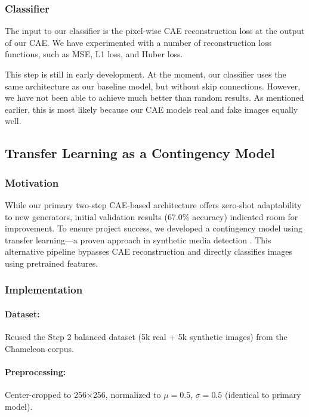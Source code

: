 \documentclass{article} %
\begin{document}
\subsubsection{Classifier}

The input to our classifier is the pixel-wise CAE reconstruction loss at the output of our CAE. We have experimented with a number of reconstruction loss functions, such as MSE, L1 loss, and Huber loss.

This step is still in early development. At the moment, our classifier uses the same architecture as our baseline model, but without skip connections. However, we have not been able to achieve much better than random results. As mentioned earlier, this is most likely because our CAE models real and fake images equally well.
\subsection{Transfer Learning as a Contingency Model}

\subsubsection{Motivation}
While our primary two-step CAE-based architecture offers zero-shot adaptability to new generators, initial validation results (67.0\% accuracy) indicated room for improvement. To ensure project success, we developed a contingency model using transfer learning—a proven approach in synthetic media detection \citep{cozzolino2024raisingbaraigeneratedimage}. This alternative pipeline bypasses CAE reconstruction and directly classifies images using pretrained features.

\subsubsection{Implementation}

\paragraph{Dataset:}
Reused the Step 2 balanced dataset (5k real + 5k synthetic images) from the Chameleon corpus.

\paragraph{Preprocessing:} Center-cropped to 256$\times$256, normalized to $\mu=0.5$, $\sigma=0.5$ (identical to primary model).
\end{document}
